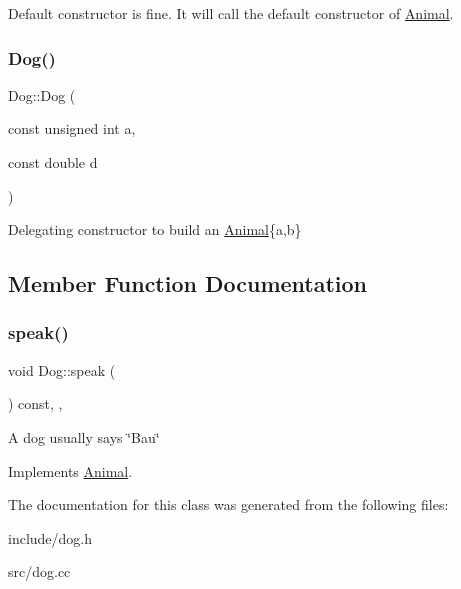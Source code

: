 Default constructor is fine. It will call the default constructor of \hyperlink{classAnimal}{Animal}. \mbox{\label{classDog_a1b72afe034eb61f5de9af43a9c8dad6f}} 
\subsubsection{\texorpdfstring{Dog()}{Dog()}\hspace{0.1cm}{\footnotesize\ttfamily [2/2]}}
{\footnotesize\ttfamily Dog\+::\+Dog (\begin{DoxyParamCaption}\item[{const unsigned int}]{a,  }\item[{const double}]{d }\end{DoxyParamCaption})}

Delegating constructor to build an \hyperlink{classAnimal}{Animal}\{a,b\} 

\subsection{Member Function Documentation}
\mbox{\label{classDog_a1b6e9a2b762fe5f905cb603789b59737}} 
\subsubsection{\texorpdfstring{speak()}{speak()}}
{\footnotesize\ttfamily void Dog\+::speak (\begin{DoxyParamCaption}{ }\end{DoxyParamCaption}) const\hspace{0.3cm}{\ttfamily [override]}, {\ttfamily [virtual]}, {\ttfamily [noexcept]}}

A dog usually says \char`\"{}\+Bau\char`\"{} 

Implements \hyperlink{classAnimal_ae3f640ffd5ebec66c3836b63fd11fc27}{Animal}.



The documentation for this class was generated from the following files\+:\begin{DoxyCompactItemize}
\item 
include/dog.\+h\item 
src/dog.\+cc\end{DoxyCompactItemize}
